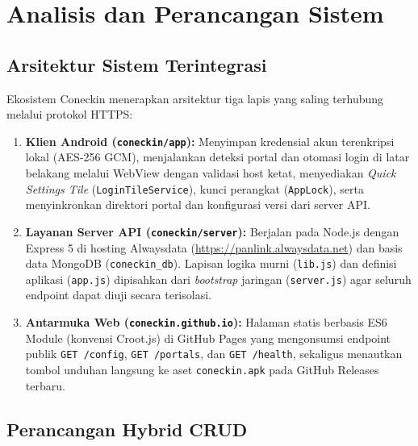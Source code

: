 \chapter{Analisis dan Perancangan Sistem}

\section{Arsitektur Sistem Terintegrasi}
Ekosistem Coneckin menerapkan arsitektur tiga lapis yang saling terhubung melalui protokol HTTPS:
\begin{enumerate}[leftmargin=*]
  \item \textbf{Klien Android (\texttt{coneckin/app}):} Menyimpan kredensial akun terenkripsi lokal (AES-256 GCM), menjalankan deteksi portal dan otomasi login di latar belakang melalui WebView dengan validasi host ketat, menyediakan \textit{Quick Settings Tile} (\texttt{LoginTileService}), kunci perangkat (\texttt{AppLock}), serta menyinkronkan direktori portal dan konfigurasi versi dari server API.
  \item \textbf{Layanan Server API (\texttt{coneckin/server}):} Berjalan pada Node.js dengan Express 5 di hosting Alwaysdata (\url{https://panlink.alwaysdata.net}) dan basis data MongoDB (\texttt{coneckin\_db}). Lapisan logika murni (\texttt{lib.js}) dan definisi aplikasi (\texttt{app.js}) dipisahkan dari \textit{bootstrap} jaringan (\texttt{server.js}) agar seluruh endpoint dapat diuji secara terisolasi.
  \item \textbf{Antarmuka Web (\texttt{coneckin.github.io}):} Halaman statis berbasis ES6 Module (konvensi Croot.js) di GitHub Pages yang mengonsumsi endpoint publik \texttt{GET /config}, \texttt{GET /portals}, dan \texttt{GET /health}, sekaligus menautkan tombol unduhan langsung ke aset \texttt{coneckin.apk} pada GitHub Releases terbaru.
\end{enumerate}

\section{Perancangan Hybrid CRUD}
